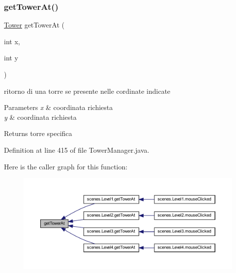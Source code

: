 \subsubsection{\texorpdfstring{get\+Tower\+At()}{getTowerAt()}}
{\footnotesize\ttfamily \hyperlink{classtowers_1_1_tower}{Tower} get\+Tower\+At (\begin{DoxyParamCaption}\item[{int}]{x,  }\item[{int}]{y }\end{DoxyParamCaption})}



ritorno di una torre se presente nelle cordinate indicate 


\begin{DoxyParams}{Parameters}
{\em x} & coordinata richiesta \\
\hline
{\em y} & coordinata richiesta\\
\hline
\end{DoxyParams}
\begin{DoxyReturn}{Returns}
torre specifica 
\end{DoxyReturn}


Definition at line 415 of file Tower\+Manager.\+java.

Here is the caller graph for this function\+:\nopagebreak
\begin{figure}[H]
\begin{center}
\leavevmode
\includegraphics[width=350pt]{classmanagers_1_1_tower_manager_a4345f2e80059788e5ab1dd1cf0ff2c04_icgraph}
\end{center}
\end{figure}
\mbox{\label{classmanagers_1_1_tower_manager_aeae3bb8b35e0507fe9105c2eb4713339}} 

